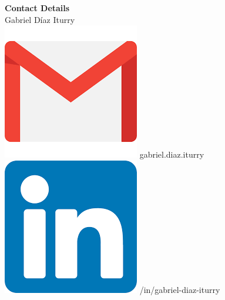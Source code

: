 \documentclass[a4paper,12pt,final]{memoir}
\begin{document}
\begin{flushleft}\small
    \vspace{10mm}
    \textbf{Contact Details}\\
    \vspace{1mm}
	Gabriel D\'iaz Iturry\\
	\vspace{1mm}
    \includegraphics[width=0.07\columnwidth]{gmail_icon.png} gabriel.diaz.iturry\\
    \vspace{1mm}
    \includegraphics[width=0.07\columnwidth]{in_icon.png} /in/gabriel-diaz-iturry \\

\end{flushleft}
\end{document}
